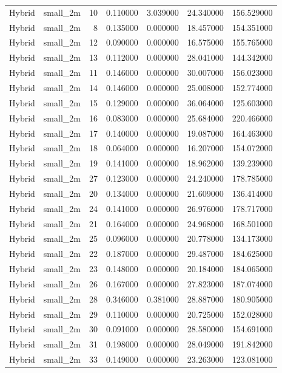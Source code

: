 \begin{tabular}{llrrrrr}
Hybrid & small_2m & 10 & 0.110000 & 3.039000 & 24.340000 & 156.529000 \\
Hybrid & small_2m & 8 & 0.135000 & 0.000000 & 18.457000 & 154.351000 \\
Hybrid & small_2m & 12 & 0.090000 & 0.000000 & 16.575000 & 155.765000 \\
Hybrid & small_2m & 13 & 0.112000 & 0.000000 & 28.041000 & 144.342000 \\
Hybrid & small_2m & 11 & 0.146000 & 0.000000 & 30.007000 & 156.023000 \\
Hybrid & small_2m & 14 & 0.146000 & 0.000000 & 25.008000 & 152.774000 \\
Hybrid & small_2m & 15 & 0.129000 & 0.000000 & 36.064000 & 125.603000 \\
Hybrid & small_2m & 16 & 0.083000 & 0.000000 & 25.684000 & 220.466000 \\
Hybrid & small_2m & 17 & 0.140000 & 0.000000 & 19.087000 & 164.463000 \\
Hybrid & small_2m & 18 & 0.064000 & 0.000000 & 16.207000 & 154.072000 \\
Hybrid & small_2m & 19 & 0.141000 & 0.000000 & 18.962000 & 139.239000 \\
Hybrid & small_2m & 27 & 0.123000 & 0.000000 & 24.240000 & 178.785000 \\
Hybrid & small_2m & 20 & 0.134000 & 0.000000 & 21.609000 & 136.414000 \\
Hybrid & small_2m & 24 & 0.141000 & 0.000000 & 26.976000 & 178.717000 \\
Hybrid & small_2m & 21 & 0.164000 & 0.000000 & 24.968000 & 168.501000 \\
Hybrid & small_2m & 25 & 0.096000 & 0.000000 & 20.778000 & 134.173000 \\
Hybrid & small_2m & 22 & 0.187000 & 0.000000 & 29.487000 & 184.625000 \\
Hybrid & small_2m & 23 & 0.148000 & 0.000000 & 20.184000 & 184.065000 \\
Hybrid & small_2m & 26 & 0.167000 & 0.000000 & 27.823000 & 187.074000 \\
Hybrid & small_2m & 28 & 0.346000 & 0.381000 & 28.887000 & 180.905000 \\
Hybrid & small_2m & 29 & 0.110000 & 0.000000 & 20.725000 & 152.028000 \\
Hybrid & small_2m & 30 & 0.091000 & 0.000000 & 28.580000 & 154.691000 \\
Hybrid & small_2m & 31 & 0.198000 & 0.000000 & 28.049000 & 191.842000 \\
Hybrid & small_2m & 33 & 0.149000 & 0.000000 & 23.263000 & 123.081000 \\

\end{tabular}
